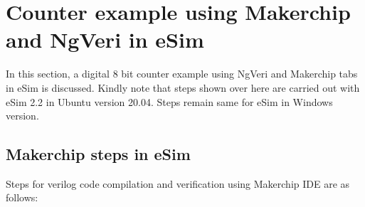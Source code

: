 \newpage

\section{Counter example using Makerchip and NgVeri in eSim}

In this section, a digital 8 bit counter example using NgVeri and Makerchip tabs in eSim is discussed. Kindly note that steps shown over here are carried out with eSim 2.2 in Ubuntu version 20.04. Steps remain same for eSim in Windows version.


\subsection {Makerchip steps in eSim}

Steps for verilog code compilation and verification using Makerchip IDE are as follows: 

